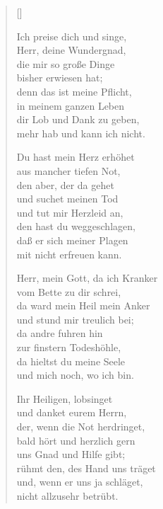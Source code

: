 \begin{multicols}{2}
\settowidth{\versewidth}{Herr, mein Gott, da ich Kranker}
\begin{verse}[\versewidth]

 Ich preise dich und singe,\\
Herr, deine Wundergnad,\\
die mir so große Dinge\\
bisher erwiesen hat;\\
denn das ist meine Pflicht,\\
in meinem ganzen Leben\\
dir Lob und Dank zu geben,\\
mehr hab und kann ich nicht.

 Du hast mein Herz erhöhet\\
aus mancher tiefen Not,\\
den aber, der da gehet\\
und suchet meinen Tod\\
und tut mir Herzleid an,\\
den hast du weggeschlagen,\\
daß er sich meiner Plagen\\
mit nicht erfreuen kann.

 Herr, mein Gott, da ich Kranker\\
vom Bette zu dir schrei,\\
da ward mein Heil mein Anker\\
und stund mir treulich bei;\\
da andre fuhren hin\\
zur finstern Todeshöhle,\\
da hieltst du meine Seele\\
und mich noch, wo ich bin.

 Ihr Heiligen, lobsinget\\
und danket eurem Herrn,\\
der, wenn die Not herdringet,\\
bald hört und herzlich gern\\
uns Gnad und Hilfe gibt;\\
rühmt den, des Hand uns träget\\
und, wenn er uns ja schläget,\\
nicht allzusehr betrübt.


\end{verse}
\end{multicols}
